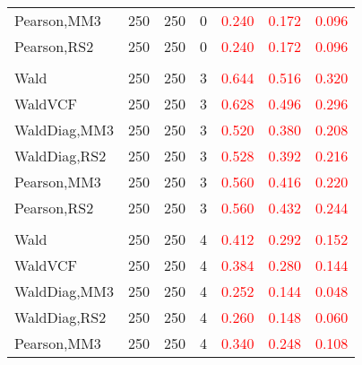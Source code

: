\documentclass[
]{article}
\begin{document}
\begin{table}[H]
{\begin{tabular}[t]{lrrrrrr}
\hspace{1em}Pearson,MM3 & 250 & 250 & 0 & \textcolor{red}{0.240} & \textcolor{red}{0.172} & \textcolor{red}{0.096}\\
\hspace{1em}Pearson,RS2 & 250 & 250 & 0 & \textcolor{red}{0.240} & \textcolor{red}{0.172} & \textcolor{red}{0.096}\\
\addlinespace[0.3em]
\multicolumn{7}{l}{\textbf{1F 15V}}\\
\hspace{1em}Wald & 250 & 250 & 3 & \textcolor{red}{0.644} & \textcolor{red}{0.516} & \textcolor{red}{0.320}\\
\hspace{1em}WaldVCF & 250 & 250 & 3 & \textcolor{red}{0.628} & \textcolor{red}{0.496} & \textcolor{red}{0.296}\\
\hspace{1em}WaldDiag,MM3 & 250 & 250 & 3 & \textcolor{red}{0.520} & \textcolor{red}{0.380} & \textcolor{red}{0.208}\\
\hspace{1em}WaldDiag,RS2 & 250 & 250 & 3 & \textcolor{red}{0.528} & \textcolor{red}{0.392} & \textcolor{red}{0.216}\\
\hspace{1em}Pearson,MM3 & 250 & 250 & 3 & \textcolor{red}{0.560} & \textcolor{red}{0.416} & \textcolor{red}{0.220}\\
\hspace{1em}Pearson,RS2 & 250 & 250 & 3 & \textcolor{red}{0.560} & \textcolor{red}{0.432} & \textcolor{red}{0.244}\\
\addlinespace[0.3em]
\multicolumn{7}{l}{\textbf{2F 10V}}\\
\hspace{1em}Wald & 250 & 250 & 4 & \textcolor{red}{0.412} & \textcolor{red}{0.292} & \textcolor{red}{0.152}\\
\hspace{1em}WaldVCF & 250 & 250 & 4 & \textcolor{red}{0.384} & \textcolor{red}{0.280} & \textcolor{red}{0.144}\\
\hspace{1em}WaldDiag,MM3 & 250 & 250 & 4 & \textcolor{red}{0.252} & \textcolor{red}{0.144} & \textcolor{red}{0.048}\\
\hspace{1em}WaldDiag,RS2 & 250 & 250 & 4 & \textcolor{red}{0.260} & \textcolor{red}{0.148} & \textcolor{red}{0.060}\\
\hspace{1em}Pearson,MM3 & 250 & 250 & 4 & \textcolor{red}{0.340} & \textcolor{red}{0.248} & \textcolor{red}{0.108}\\

\end{tabular}}
\end{table}
\end{document}
